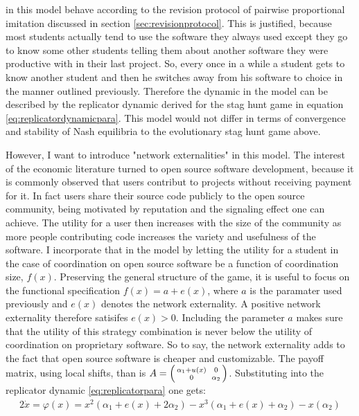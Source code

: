 \documentclass[11pt]{article}
\begin{document}
in this model behave according to the revision protocol of pairwise
proportional imitation discussed in section \ref{sec:revisionprotocol}. This
is justified, because most students actually tend to use the software they
always used except they go to know some other students telling them about
another software they were productive with in their last project. So, 
every once in a while a student gets to know another student and then he switches
away from his software to choice in the manner outlined previously. 
Therefore the dynamic in the model can be described by the replicator dynamic
derived for the stag hunt game in equation \eqref{eq:replicatordynamicpara}.
This model would not differ in terms of convergence and stability of Nash 
equilibria to the evolutionary stag hunt game above.

However, I want to introduce "network externalities" in this model. 
The interest of the economic literature turned to open source software 
development, because it is commonly observed that users contribut to 
projects without receiving payment for it.
In fact users share their source code publicly to the open source community,
being motivated by reputation and the signaling effect one can achieve.
The utility for a user then increases with the size of the community as 
more people contributing code increases the variety and usefulness of the 
software. I incorporate that in the model by letting the utility for a student 
in the case of coordination on open source software be a function of 
coordination size, $f(x)$. 
Preserving the general structure of the
game, it is useful to focus on the functional specification 
$f(x) = a + e(x)$, where $a$ is the paramater used previously and $e(x)$ 
denotes the network externality. 
A positive network externality therefore satisifes $e(x)>0$. Including the
parameter $a$ makes sure that the utility of this strategy combination is 
never below the utility of coordination on proprietary software. So to say,
the network externality adds to the fact that open source software is cheaper 
and customizable. The payoff matrix, using local shifts, than is 
$A=\begin{psmallmatrix}\alpha_1+u(x) && 0 \\ 0&& \alpha_2\end{psmallmatrix}$. 
Substituting into the replicator dynamic  \ref{eq:replicatorpara} one gets:
\begin{alignat}{2}
        \dot{x} = \varphi(x) = x^2(\alpha_1+e(x) +2\alpha_2 ) 
        - x^3(\alpha_1+e(x)+\alpha_2) - x(\alpha_2)
\end{alignat}
\end{document}
